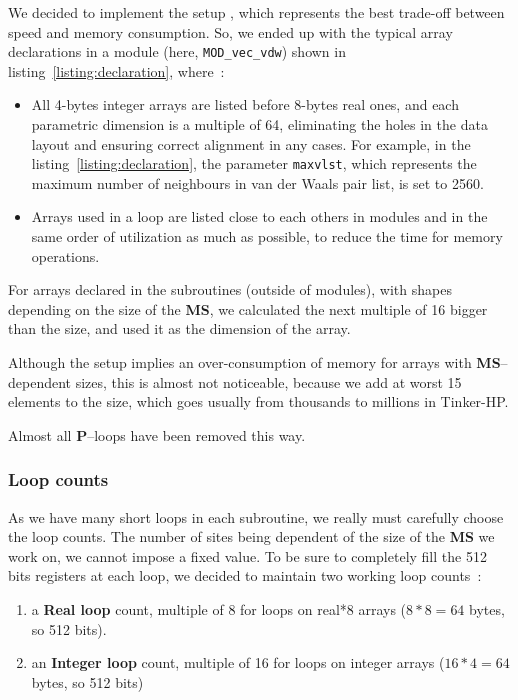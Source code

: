\documentclass[9pt,comparison]{livecoms}
\newcommand{\lv}{\Large\verb}
\newlength{\mytabsav}
\begin{document}
\setlength\tabcolsep\mytabsav %


We decided to implement the setup {\huge{}}, which represents the best trade-off between speed and memory consumption. So, we ended up with the typical array declarations in a module (here, {\color{codepurple}\lv|MOD_vec_vdw|}) shown in listing~\ref{listing:declaration}, where~:
\begin{itemize}
    \item All 4-bytes integer arrays are listed before 8-bytes real ones, and each parametric dimension is a multiple of 64, eliminating the holes in the data layout and ensuring correct alignment in any cases. For example, in the listing~\ref{listing:declaration}, the parameter {\color{blue}\lv|maxvlst|}, which represents the maximum number of neighbours in van der Waals pair list,  is set to 2560.
    \item Arrays used in a loop are listed close to each others in modules and in the same order of utilization as much as possible, to reduce the time for memory operations.
\end{itemize}

For arrays declared in the subroutines (outside of modules), with shapes depending on the size of the \textbf{MS}, we calculated the next multiple of 16 bigger than the size, and used it as the dimension of the array.

Although the setup {\huge{}} implies an over-consumption of memory for arrays with \textbf{MS}--dependent sizes, this is almost not noticeable, because we add at worst 15 elements to the size, which goes usually from thousands to millions in Tinker-HP.

Almost all \textbf{P}--loops have been removed this way.
\subsubsection{Loop counts}
\hspace{\parindent}As we have many short loops in each subroutine, we really must carefully choose the loop counts. The number of sites being dependent of the size of the \textbf{MS} we work on, we cannot impose a fixed value. To be sure to completely fill the 512 bits registers at each loop, we decided to maintain two working loop counts~:
\begin{enumerate}
    \item a \textbf{Real loop} count, multiple of 8 for loops on {\color{codegreen} real*8} arrays ($8*8=64$ bytes, so 512 bits).
    \item an \textbf{Integer loop} count, multiple of 16 for loops on {\color{codegreen} integer} arrays ($16*4=64$ bytes, so 512 bits)
\end{enumerate}
\end{document}
